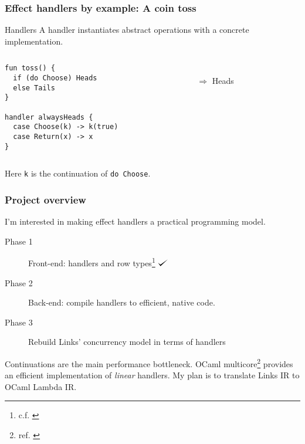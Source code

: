 \documentclass[10pt,compress]{beamer}
\def\checkmark{\tikz\fill[scale=0.4](0,.35) -- (.25,0) -- (1,.7) -- (.25,.15) -- cycle;}
\begin{document}
\begin{frame}[fragile]
  \frametitle{Effect handlers by example: A coin toss}
\begin{block}{Handlers}
A handler instantiates abstract operations with a concrete implementation.
\end{block}
\begin{columns}
\begin{column}{0.5\textwidth}
\begin{lstlisting}
fun toss() {
  if (do Choose) Heads
  else Tails
}

handler alwaysHeads {
  case Choose(k) -> k(true)
  case Return(x) -> x
}
\end{lstlisting}
\end{column}
\begin{column}{0.5\textwidth}
\\
$\Longrightarrow$ Heads
\end{column}
\end{columns}
Here \lstinline$k$ is the continuation of \lstinline$do Choose$.
\end{frame}

\begin{frame}
  \frametitle{Project overview}
I'm interested in making effect handlers a practical programming model.
\begin{description}
  \item[Phase 1] Front-end: handlers and row types\footnote{c.f. \citet{Hillerstrom2016}} $\checkmark$
  \item[Phase 2] Back-end: compile handlers to efficient, native code.
  \item[Phase 3] Rebuild Links' concurrency model in terms of handlers
\end{description}
Continuations are the main performance bottleneck.
OCaml multicore\footnote{ref. \citet{Dolan2015}} provides an efficient implementation of \emph{linear} handlers.
My plan is to translate Links IR to OCaml Lambda IR.
\end{frame}
\end{document}

